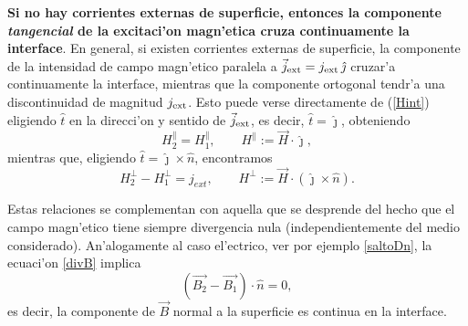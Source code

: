 \textbf{Si no hay corrientes externas de superficie, entonces la componente \textit{tangencial} de la excitaci'on magn'etica cruza continuamente la interface}. En general, si
existen corrientes externas de superficie, la componente de la intensidad de
campo magn'etico paralela a $\vec{j}_{\rm ext}=j_{\rm ext}\,\hat{\jmath}$ cruzar'a continuamente la interface, mientras que la componente ortogonal tendr'a una discontinuidad de magnitud $j_{\rm ext}$. Esto puede verse directamente
de (\ref{Hint}) eligiendo $\hat{t}$ en la direcci'on y sentido de
$\vec{j}_{\rm ext}$, es decir, $\hat{t}=\hat{\jmath}$, obteniendo
\begin{equation}
 H_2^\parallel=H_1^\parallel,  \qquad H^\parallel:=\vec{H}\cdot\hat{\jmath},
\end{equation}
mientras que, eligiendo $\hat{t}=\hat{\jmath}\times\hat{n}$, encontramos
\begin{equation}
 H_2^\perp-H_1^\perp=j_{ext},  \qquad
H^\perp:=\vec{H}\cdot(\hat{\jmath}\times\hat{n}).
\end{equation}

Estas relaciones se complementan con aquella que se desprende del hecho que el campo magn'etico tiene siempre divergencia nula (independientemente del medio considerado). An'alogamente al caso el'ectrico, ver por ejemplo \eqref{saltoDn}, la ecuaci'on \eqref{divB} implica 
\begin{equation}\label{saltoBn}
\boxed{\left(\vec{B_2}-\vec{B_1}\right)\cdot\hat{n}=0,}
\end{equation}
es decir, la componente de $\vec{B}$ normal a la superficie es continua en la interface.

